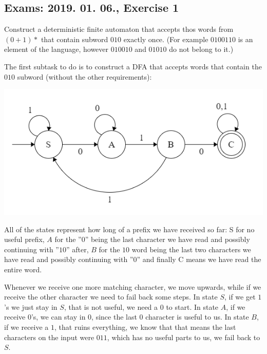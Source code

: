 \subsection {Exams: 2019. 01. 06., Exercise 1}


Construct a deterministic finite automaton that accepts thos words from $(0+1)*$ that contain subword $010$ exactly once. (For example $0100110$ is an element of the language, however $010010$ and $01010$ do not belong to it.)


The first subtask to do is to construct a DFA that accepts words that contain the $010$ subword (without the other requirements):

\begin{center}
    \includegraphics[width=\linewidth]{./exams/2019_01_06/01/step_1.png}
\end{center}

All of the states represent how long of a prefix we have received so far: S for no useful prefix, $A$ for the ''$0$'' being the last character we have read and possibly continuing with ''$10$'' after, $B$ for the $10$ word being the last two characters we have read and possibly continuing with ''$0$'' and finally C means we have read the entire word.

Whenever we receive one more matching character, we move upwards, while if we receive the other character we need to fail back some steps. In state $S$, if we get $1$'s we just stay in $S$, that is not useful, we need a $0$ to start. In state $A$, if we receive $0$'s, we can stay in $0$, since the last $0$ character is useful to us. In state $B$, if we receive a $1$, that ruins everything, we know that that means the last characters on the input were $011$, which has no useful parts to us, we fail back to $S$.

